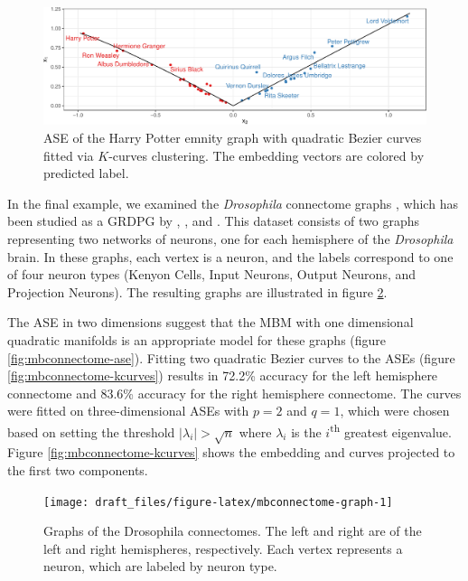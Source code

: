 \documentclass[
  12pt,
]{article}
\theoremstyle{definition}
\theoremstyle{definition}
\theoremstyle{definition}
\theoremstyle{definition}
\theoremstyle{remark}
\begin{document}
\begin{figure}[H]

{\centering \includegraphics{draft_files/figure-latex/hp-kcurves-1} 

}

\caption{ASE of the Harry Potter emnity graph with quadratic Bezier curves fitted via $K$-curves clustering. The embedding vectors are colored by predicted label.}\label{fig:hp-kcurves}
\end{figure}

In the final example, we examined the \emph{Drosophila} connectome graphs \citep{Eichler141762}, which has been studied as a GRDPG by \citet{athreya2017statistical}, \citet{https://doi.org/10.48550/arxiv.1705.03297}, and \citet{SannaPassino2022}.
This dataset consists of two graphs representing two networks of neurons, one for each hemisphere of the \emph{Drosophila} brain.
In these graphs, each vertex is a neuron, and the labels correspond to one of four neuron types (Kenyon Cells, Input Neurons, Output Neurons, and Projection Neurons).
The resulting graphs are illustrated in figure \ref{fig:mbconnectome-graph}.

The ASE in two dimensions suggest that the MBM with one dimensional quadratic manifolds is an appropriate model for these graphs (figure \ref{fig:mbconnectome-ase}).
Fitting two quadratic Bezier curves to the ASEs (figure \ref{fig:mbconnectome-kcurves}) results in 72.2\% accuracy for the left hemisphere connectome and 83.6\% accuracy for the right hemisphere connectome.
The curves were fitted on three-dimensional ASEs with \(p = 2\) and \(q = 1\), which were chosen based on setting the threshold \(|\lambda_i| > \sqrt{n}\) where \(\lambda_i\) is the \(i\)\textsuperscript{th} greatest eigenvalue.
Figure \ref{fig:mbconnectome-kcurves} shows the embedding and curves projected to the first two components.

\begin{figure}[H]

{\centering \texttt{[image: draft\_files/figure-latex/mbconnectome-graph-1]} 

}

\caption{Graphs of the Drosophila connectomes. The left and right are of the left and right hemispheres, respectively. Each vertex represents a neuron, which are labeled by neuron type.}\label{fig:mbconnectome-graph}
\end{figure}
\end{document}
